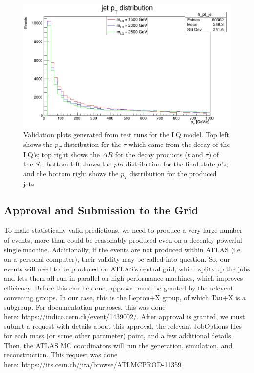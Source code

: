 \begin{figure}[ht!]
            \includegraphics[scale=0.2]{res/ValidationPlots/h_pt_jet.png}

            \caption{Validation plots generated from test runs for the LQ model. Top left shows the $p_T$ distribution for the $\tau$ which came from the decay of the LQ's; top right shows the $\Delta R$ for the decay products ($t$ and $\tau$) of the $S_1$; bottom left shows the $phi$ distribution for the final state $\mu$'s; and the bottom right shows the $p_T$ distribution for the produced jets.}
            \label{validationPlots}
        \end{figure}

    \subsection{Approval and Submission to the Grid}
        To make statistically valid predictions, we need to produce a very large number of events, more than could be reasonably produced even on a decently powerful single machine. Additionally, if the events are not produced within ATLAS (i.e. on a personal computer), their validity may be called into question. So, our events will need to be produced on ATLAS's central grid, which splits up the jobs and lets them all run in parallel on high-performance machines, which improves efficiency. Before this can be done, approval must be granted by the relevent convening groups. In our case, this is the Lepton+X group, of which Tau+X is a subgroup. For documentation purposes, this was done here:~\url{https://indico.cern.ch/event/1439002/}. After approval is granted, we must submit a request with details about this approval, the relevant JobOptions files for each mass (or some other parameter) point, and a few additional details. Then, the ATLAS MC coordinators will run the generation, simulation, and reconstruction. This request was done here:~\url{https://its.cern.ch/jira/browse/ATLMCPROD-11359}

        
